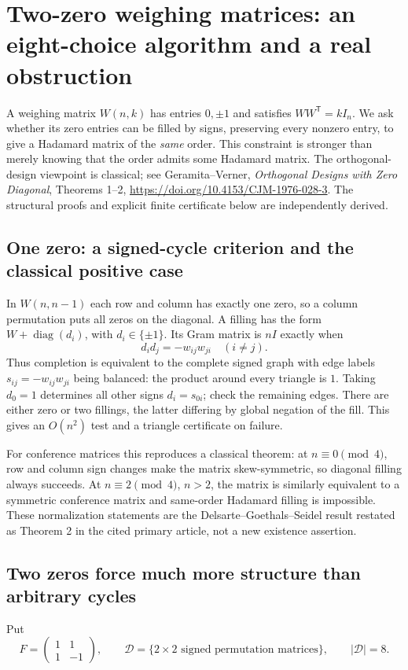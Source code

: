 \section{Two-zero weighing matrices: an eight-choice algorithm and a real obstruction}
\label{sec:weighing-fill}

A weighing matrix $W(n,k)$ has entries $0,\pm1$ and satisfies
$WW^{\mathsf T}=kI_n$. We ask whether its zero entries can be
filled by signs, preserving every nonzero entry, to give a Hadamard
matrix of the \emph{same} order. This constraint is stronger than
merely knowing that the order admits some Hadamard matrix.
The orthogonal-design viewpoint is classical; see Geramita--Verner,
\emph{Orthogonal Designs with Zero Diagonal}, Theorems 1--2,
\url{https://doi.org/10.4153/CJM-1976-028-3}.
The structural proofs and explicit finite certificate below are
independently derived.

\subsection{One zero: a signed-cycle criterion and the classical positive case}
In $W(n,n-1)$ each row and column has exactly one zero, so a column
permutation puts all zeros on the diagonal. A filling has the form
$W+\operatorname{diag}(d_i)$, with $d_i\in\{\pm1\}$. Its Gram
matrix is $nI$ exactly when
\[
 d_id_j=-w_{ij}w_{ji}\quad(i\ne j).
\]
Thus completion is equivalent to the complete signed graph with edge
labels $s_{ij}=-w_{ij}w_{ji}$ being balanced: the product around every
triangle is $1$. Taking $d_0=1$ determines all other signs
$d_i=s_{0i}$; check the remaining edges. There are either zero or
two fillings, the latter differing by global negation of the fill.
This gives an $O(n^2)$ test and a triangle certificate on failure.

For conference matrices this reproduces a classical theorem:
at $n\equiv0\pmod4$, row and column sign changes make the matrix
skew-symmetric, so diagonal filling always succeeds. At
$n\equiv2\pmod4$, $n>2$, the matrix is similarly equivalent to a
symmetric conference matrix and same-order Hadamard filling is
impossible. These normalization statements are the
Delsarte--Goethals--Seidel result restated as Theorem 2 in the cited
primary article, not a new existence assertion.

\subsection{Two zeros force much more structure than arbitrary cycles}
Put
\[
 F=\begin{pmatrix}1&1\\1&-1\end{pmatrix},\qquad
 \mathcal D=\{2\times2\text{ signed permutation matrices}\},
 \qquad|\mathcal D|=8.
\]

